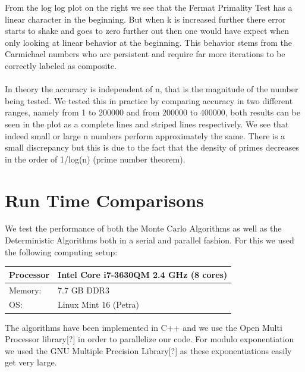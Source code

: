 \documentclass[compressed,final,notitlepage,narroweqnarray,inline,twoside,]{ieee}
\begin{document}
From the log log plot on the right we see that the Fermat Primality Test has a linear character in the beginning. But when k is increased further there error starts to shake and goes to zero further out then one would have expect when only looking at linear behavior at the beginning. This behavior stems from the Carmichael numbers who are persistent and require far more iterations to be correctly labeled as composite.\\\\ In theory the accuracy is independent of n, that is the magnitude of the number being tested. We tested this in practice by comparing accuracy in two different ranges, namely from 1 to 200000 and from 200000 to 400000, both results can be seen in the plot as a complete lines and striped lines respectively. We see that indeed small or large n numbers perform approximately the same. There is a small discrepancy but this is due to the fact that the density of primes decreases in the order of 1/log(n) (prime number theorem). 
\section{Run Time Comparisons}
We test the performance of both the Monte Carlo Algorithms as well as the Deterministic Algorithms both in a serial and parallel fashion. For this we used the following computing setup:
\begin{tabular}{l|l}
\hline
Processor & Intel Core i7-3630QM 2.4 GHz (8 cores)\\\hline
Memory: & 7.7 GB DDR3 \\\hline
OS: & Linux Mint 16 (Petra)\\\hline
\end{tabular}
The algorithms have been implemented in C++ and we use the Open Multi Processor library[?] in order to parallelize our code. For modulo exponentiation we used the GNU Multiple Precision Library[?] as these exponentiations easily get very large.
\end{document}
